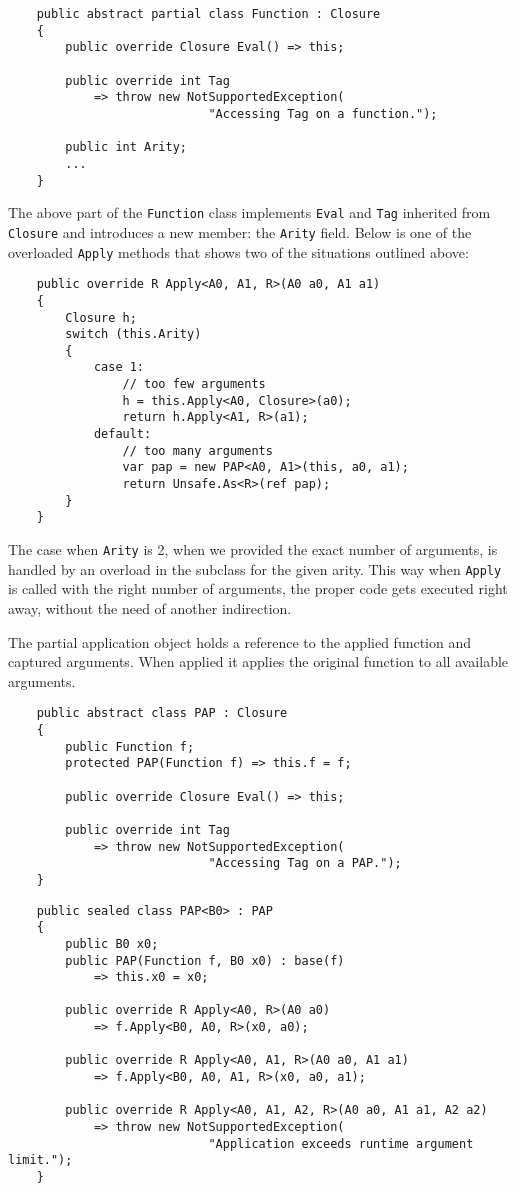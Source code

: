 \documentclass[en]{pracamgr}
\begin{document}
\begin{verbatim}
    public abstract partial class Function : Closure
    {
        public override Closure Eval() => this;

        public override int Tag
            => throw new NotSupportedException(
                            "Accessing Tag on a function.");
        
        public int Arity;
        ...
    }
\end{verbatim}

The above part of the \texttt{Function} class implements \texttt{Eval}
and \texttt{Tag} inherited from \texttt{Closure} and introduces
a new member: the \texttt{Arity} field.
Below is one of the overloaded \texttt{Apply} methods that shows
two of the situations outlined above:

\begin{verbatim}
    public override R Apply<A0, A1, R>(A0 a0, A1 a1)
    {
        Closure h;
        switch (this.Arity)
        {
            case 1:
                // too few arguments
                h = this.Apply<A0, Closure>(a0);
                return h.Apply<A1, R>(a1);
            default:
                // too many arguments
                var pap = new PAP<A0, A1>(this, a0, a1);
                return Unsafe.As<R>(ref pap);
        }
    }
\end{verbatim}

The case when \texttt{Arity} is 2, when we provided the exact number of arguments,
is handled by an overload in the subclass for the given arity.
This way when \texttt{Apply} is called with the right number
of arguments, the proper code gets executed right away,
without the need of another indirection.

The partial application object holds a reference to the
applied function and captured arguments.
When applied it applies the original function to all available arguments.

\begin{verbatim}
    public abstract class PAP : Closure
    {
        public Function f;
        protected PAP(Function f) => this.f = f;

        public override Closure Eval() => this;

        public override int Tag
            => throw new NotSupportedException(
                            "Accessing Tag on a PAP.");
    }
\end{verbatim}
\begin{verbatim}
    public sealed class PAP<B0> : PAP
    {
        public B0 x0;
        public PAP(Function f, B0 x0) : base(f)
            => this.x0 = x0;

        public override R Apply<A0, R>(A0 a0)
            => f.Apply<B0, A0, R>(x0, a0);
        
        public override R Apply<A0, A1, R>(A0 a0, A1 a1) 
            => f.Apply<B0, A0, A1, R>(x0, a0, a1);
        
        public override R Apply<A0, A1, A2, R>(A0 a0, A1 a1, A2 a2)
            => throw new NotSupportedException(
                            "Application exceeds runtime argument limit.");
    }
\end{verbatim}
\end{document}
